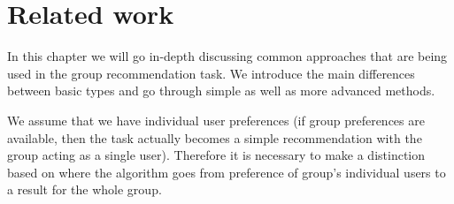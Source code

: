 \chapter{Related work} \label{chap:related_work}
In this chapter we will go in-depth discussing common approaches that are being used in the group recommendation task. We introduce the main differences between basic types  and go through simple as well as more advanced methods.\newline

We assume that we have individual user preferences (if group preferences are available, then the task actually becomes a simple recommendation with the group acting as a single user). Therefore it is necessary to make a distinction based on where the algorithm goes from preference of group's individual users to a result for the whole group.
